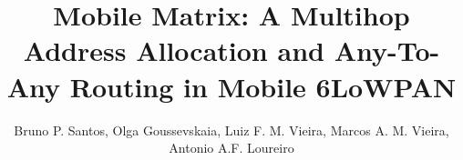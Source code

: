 \documentclass[sigconf]{acmart}
\begin{document}
\title{Mobile Matrix: A Multihop Address Allocation and Any-To-Any Routing in Mobile 6LoWPAN}


\author{Bruno P. Santos, Olga Goussevskaia, Luiz F. M. Vieira,  Marcos A. M. Vieira, Antonio A.F. Loureiro}
    
    





\end{document}
